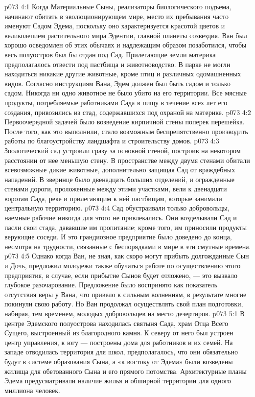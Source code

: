 \vs p073 4:1 Когда Материальные Сыны, реализаторы биологического подъема, начинают обитать в эволюционирующем мире, место их пребывания часто именуют Садом Эдема, поскольку оно характеризуется красотой цветов и великолепием растительного мира Эдентии, главной планеты созвездия. Ван был хорошо осведомлен об этих обычаях и надлежащим образом позаботился, чтобы весь полуостров был бы отдан под Сад. Прилегающие земли материка предполагалось отвести под пастбища и животноводство. В парке не могли находиться никакие другие животные, кроме птиц и различных одомашненных видов. Согласно инструкциям Вана, Эдем должен был быть садом и только садом. Никогда ни одно животное не было убито на его территории. Все мясные продукты, потребляемые работниками Сада в пищу в течение всех лет его создания, привозились из стад, содержавшихся под охраной на материке.
\vs p073 4:2 Первоочередной задачей было возведение кирпичной стены поперек перешейка. После того, как это выполнили, стало возможным беспрепятственно производить работы по благоустройству ландшафта и строительству домов.
\vs p073 4:3 Зоологический сад устроили сразу за основной стеной, построив на некотором расстоянии от нее меньшую стену. В пространстве между двумя стенами обитали всевозможные дикие животные, дополнительно защищая Сад от враждебных нападений. В зверинце было двенадцать больших отделений, и огражденные стенами дороги, проложенные между этими участками, вели к двенадцати воротам Сада, реке и прилегающим к ней пастбищам, которые занимали центральную территорию.
\vs p073 4:4 Сад обустраивали только добровольцы, наемные рабочие никогда для этого не привлекались. Они возделывали Сад и пасли свои стада, дававшие им пропитание; кроме того, им приносили продукты верующие соседи. И это грандиозное предприятие было доведено до конца, несмотря на трудности, связанные с беспорядками в мире в эти смутные времена.
\vs p073 4:5 Однако когда Ван, не зная, как скоро могут прибыть долгожданные Сын и Дочь, предложил молодежи также обучаться работе по осуществлению этого предприятия, в случае, если прибытие Сынов будет отложено, --- это вызвало глубокое разочарование. Предложение было воспринято как показатель отсутствия веры у Вана, что привело к сильным волнениям, в результате многие покинули свою работу. Но Ван продолжал осуществлять свой план подготовки, набирая, тем временем, молодых добровольцев на место дезертиров.
\vs p073 5:1 В центре Эдемского полуострова находилась святыня Сада, храм Отца Всего Сущего, выстроенный из благородного камня. К северу от него был устроен центр управления, к югу --- построены дома для работников и их семей. На западе отводилась территория для школ, предполагалось, что они обязательно будут в системе образования Сына, а «к востоку от Эдема» были возведены жилища для обетованного Сына и его прямого потомства. Архитектурные планы Эдема предусматривали наличие жилья и обширной территории для одного миллиона человек.
